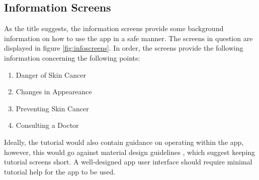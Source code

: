 \subsection{Information Screens} \label{sec:infoscreens}
As the title suggests, the information screens provide some background information on how to use the app in a safe manner. The screens in question are displayed in figure \ref{fig:infoscreens}. In order, the screens provide the following information concerning the following points:
\begin{enumerate}
    \item Danger of Skin Cancer
    \item Changes in Appeareance
    \item Preventing Skin Cancer
    \item Consulting a Doctor
\end{enumerate}

Ideally, the tutorial would also contain guidance on operating within the app, however, this would go against material design guidelines \cite{onboarding}, which suggest keeping tutorial screens short. A well-designed app user interface should require minimal tutorial help for the app to be used.

